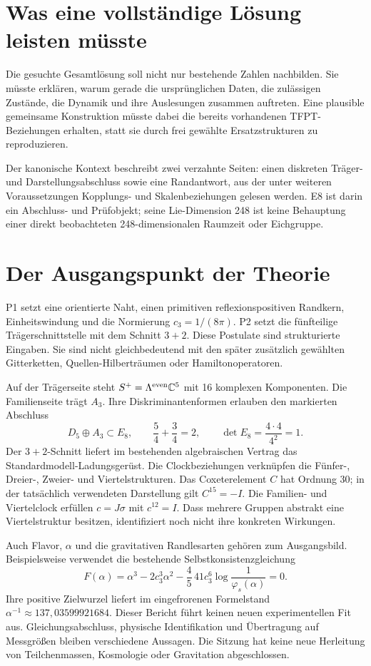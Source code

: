 \section{Was eine vollständige Lösung leisten müsste}
Die gesuchte Gesamtlösung soll nicht nur bestehende Zahlen nachbilden. Sie müsste erklären, warum gerade die ursprünglichen Daten, die zulässigen Zustände, die Dynamik und ihre Auslesungen zusammen auftreten. Eine plausible gemeinsame Konstruktion müsste dabei die bereits vorhandenen TFPT-Beziehungen erhalten, statt sie durch frei gewählte Ersatzstrukturen zu reproduzieren.

Der kanonische Kontext beschreibt zwei verzahnte Seiten: einen diskreten Träger- und Darstellungsabschluss sowie eine Randantwort, aus der unter weiteren Voraussetzungen Kopplungs- und Skalenbeziehungen gelesen werden. E8 ist darin ein Abschluss- und Prüfobjekt; seine Lie-Dimension 248 ist keine Behauptung einer direkt beobachteten 248-dimensionalen Raumzeit oder Eichgruppe. 

\section{Der Ausgangspunkt der Theorie}
P1 setzt eine orientierte Naht, einen primitiven reflexionspositiven Randkern, Einheitswindung und die Normierung $c_3=1/(8\pi)$. P2 setzt die fünfteilige Trägerschnittstelle mit dem Schnitt $3+2$. Diese Postulate sind strukturierte Eingaben. Sie sind nicht gleichbedeutend mit den später zusätzlich gewählten Gitterketten, Quellen-Hilberträumen oder Hamiltonoperatoren.

Auf der Trägerseite steht $S^+=\Lambda^{\mathrm{even}}\mathbb C^5$ mit 16 komplexen Komponenten. Die Familienseite trägt $A_3$. Ihre Diskriminantenformen erlauben den markierten Abschluss
\[
 D_5\oplus A_3\subset E_8,\qquad
 \frac54+\frac34=2,\qquad
 \det E_8=\frac{4\cdot4}{4^2}=1.
\]
Der $3+2$-Schnitt liefert im bestehenden algebraischen Vertrag das Standardmodell-Ladungsgerüst. Die Clockbeziehungen verknüpfen die Fünfer-, Dreier-, Zweier- und Viertelstrukturen. Das Coxeterelement $C$ hat Ordnung 30; in der tatsächlich verwendeten Darstellung gilt $C^{15}=-I$. Die Familien- und Viertelclock erfüllen $c=J\sigma$ mit $c^{12}=I$. Dass mehrere Gruppen abstrakt eine Viertelstruktur besitzen, identifiziert noch nicht ihre konkreten Wirkungen. 

Auch Flavor, $\alpha$ und die gravitativen Randlesarten gehören zum Ausgangsbild. Beispielsweise verwendet die bestehende Selbstkonsistenzgleichung
\[
 F(\alpha)=\alpha^3-2c_3^3\alpha^2-\frac45\,41c_3^6
 \log\!\frac1{\varphi_s(\alpha)}=0.
\]
Ihre positive Zielwurzel liefert im eingefrorenen Formelstand $\alpha^{-1}\approx137{,}03599921684$. Dieser Bericht führt keinen neuen experimentellen Fit aus. Gleichungsabschluss, physische Identifikation und Übertragung auf Messgrößen bleiben verschiedene Aussagen. Die Sitzung hat keine neue Herleitung von Teilchenmassen, Kosmologie oder Gravitation abgeschlossen. 

